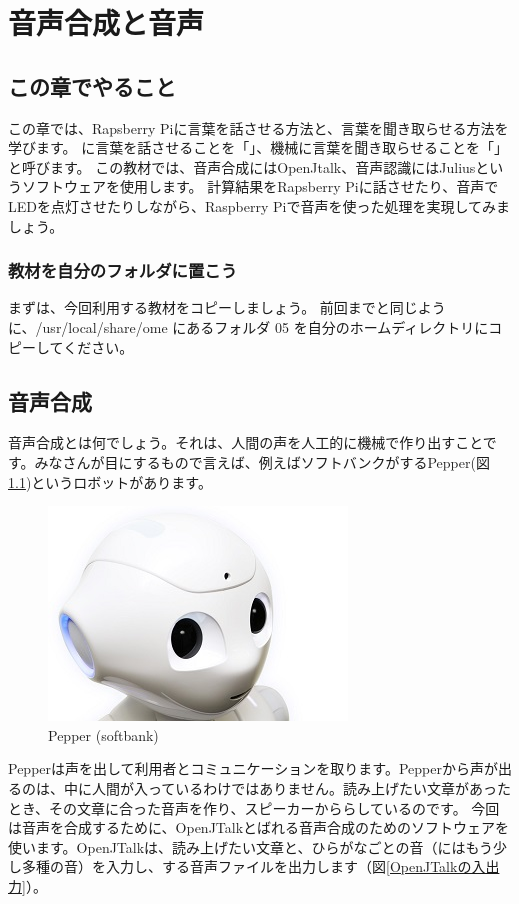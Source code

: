 \chapter{音声合成と音声}
\section{この章でやること}

この章では、Rapsberry Piに言葉を話させる方法と、言葉を聞き取らせる方法を学びます。
に言葉を話させることを「」、機械に言葉を聞き取らせることを「」と呼びます。
この教材では、音声合成にはOpenJtalk、音声認識にはJuliusというソフトウェアを使用します。
計算結果をRapsberry Piに話させたり、音声でLEDを点灯させたりしながら、Raspberry Piで音声を使った処理を実現してみましょう。

\subsection{教材を自分のフォルダに置こう}
まずは、今回利用する教材をコピーしましょう。
前回までと同じように、\nobreak/usr/local/share/ome にあるフォルダ 05 を自分のホームディレクトリにコピーしてください。

\newpage
\section{音声合成}
音声合成とは何でしょう。それは、人間の声を人工的に機械で作り出すことです。みなさんが目にするもので言えば、例えばソフトバンクがするPepper(図\ref{pepper})というロボットがあります。

\begin{figure}[H]
\begin{center}
    \includegraphics[width=.4\linewidth]{images/chap06/text06-img001.jpg}
    \caption{Pepper (softbank)}
    \label{pepper}
\end{center}
\end{figure}

Pepperは声を出して利用者とコミュニケーションを取ります。Pepperから声が出るのは、中に人間が入っているわけではありません。読み上げたい文章があったとき、その文章に合った音声を作り、スピーカーかららしているのです。
今回は音声を合成するために、OpenJTalkとばれる音声合成のためのソフトウェアを使います。OpenJTalkは、読み上げたい文章と、ひらがなごとの音（にはもう少し多種の音）を入力し、する音声ファイルを出力します（図\ref{OpenJTalkの入出力}）。


